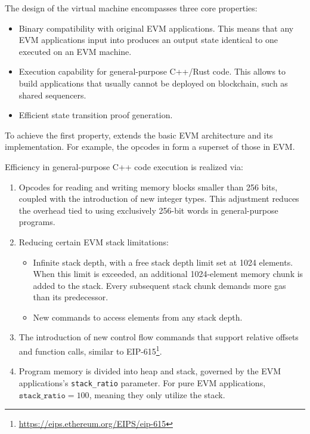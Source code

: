 The design of the virtual machine encompasses three core properties:
\begin{itemize}
    \item Binary compatibility with original EVM applications. 
        This means that any EVM applications input into \evm produces 
        an output state identical to one executed on an EVM machine.
    \item Execution capability for general-purpose C++/Rust code.
        This allows to build applications that usually cannot be deployed
        on blockchain, such as shared sequencers. 
    \item Efficient state transition proof generation.
\end{itemize}

To achieve the first property, \evm extends 
the basic EVM architecture and its implementation. 
For example, the opcodes in \evm form a superset of those in EVM.

Efficiency in general-purpose C++ code execution is realized via:
\begin{enumerate}
    \item Opcodes for reading and writing memory blocks 
        smaller than 256 bits, coupled with the introduction of new integer types. 
        This adjustment reduces the overhead tied to using 
        exclusively 256-bit words in general-purpose programs.
    \item Reducing certain EVM stack limitations:
        \begin{itemize}
            \item Infinite stack depth, with a free stack depth limit set at 1024 elements. 
                When this limit is exceeded, an additional 
                1024-element memory chunk is added to the stack. 
                Every subsequent stack chunk demands more gas than its predecessor.
            \item New commands to access elements from any stack depth.
        \end{itemize}
    \item The introduction of new control flow commands that support 
        relative offsets and function calls, similar to EIP-615\footnote{
        \url{https://eips.ethereum.org/EIPS/eip-615}}.
    \item Program memory is divided into heap and stack, governed by 
        the EVM applications's \texttt{stack\_ratio} parameter. 
        For pure EVM applications, $\texttt{stack\_ratio} = 100$, meaning 
        they only utilize the stack.
\end{enumerate}


